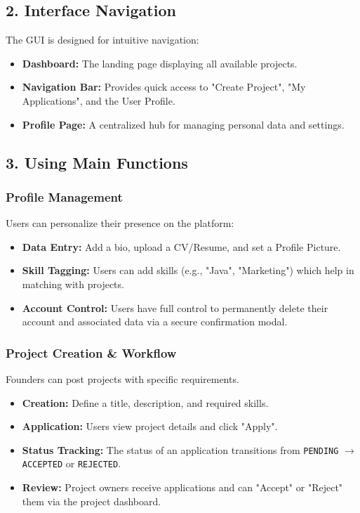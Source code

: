 \documentclass[12pt,a4paper]{article}
\begin{document}
\subsection{2. Interface Navigation}
The GUI is designed for intuitive navigation:
\begin{itemize}
    \item \textbf{Dashboard:} The landing page displaying all available projects.
    \item \textbf{Navigation Bar:} Provides quick access to "Create Project", "My Applications", and the User Profile.
    \item \textbf{Profile Page:} A centralized hub for managing personal data and settings.
\end{itemize}

\subsection{3. Using Main Functions}

\subsubsection{Profile Management}
Users can personalize their presence on the platform:
\begin{itemize}
    \item \textbf{Data Entry:} Add a bio, upload a CV/Resume, and set a Profile Picture.
    \item \textbf{Skill Tagging:} Users can add skills (e.g., "Java", "Marketing") which help in matching with projects.
    \item \textbf{Account Control:} Users have full control to permanently delete their account and associated data via a secure confirmation modal.
\end{itemize}

\subsubsection{Project Creation & Workflow}
Founders can post projects with specific requirements.
\begin{itemize}
    \item \textbf{Creation:} Define a title, description, and required skills.
    \item \textbf{Application:} Users view project details and click "Apply".
    \item \textbf{Status Tracking:} The status of an application transitions from \texttt{PENDING} $\rightarrow$ \texttt{ACCEPTED} or \texttt{REJECTED}.
    \item \textbf{Review:} Project owners receive applications and can "Accept" or "Reject" them via the project dashboard.
\end{itemize}
\end{document}
